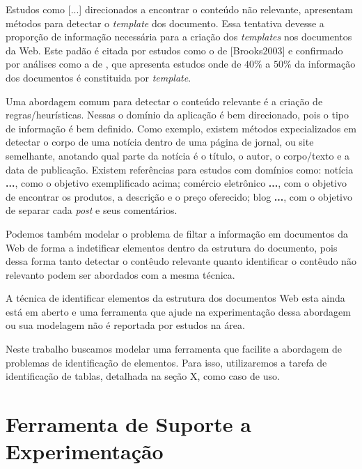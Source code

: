 \documentclass[12pt, a4paper]{article}
\newcommand{\remove}[1]{}
\begin{document}
Estudos como [...] direcionados a encontrar o conteúdo não relevante,
apresentam métodos para detectar o {\it template} dos documento.
	Essa tentativa devesse a proporção de informação necessária para a criação
	dos {\it templates} nos documentos da Web. Este padão é 
	citada por estudos como o de [Brooks2003] e confirmado por análises 
	como a de \cite{Gibson2005}, que apresenta estudos onde de $40\%$ a $50\%$ da 
  informação dos documentos é constituida por {\it template}.


Uma abordagem comum para detectar o conteúdo relevante é a criação de
regras/heurísticas. 
	Nessas 
		o domínio da aplicação é bem direcionado, pois o tipo de informação é 
		bem definido.
		Como exemplo,
			existem métodos expecializados em detectar o corpo de uma notícia 
			dentro de uma página de jornal, ou site semelhante,
			anotando qual parte da notícia é 
				o título,
				o autor, o corpo/texto e
				a data de publicação.
			Existem referências para estudos com domínios como:
				notícia {\bf \cite{}...}, como o objetivo exemplificado acima;
				comércio eletrônico {\bf \cite{}...}, com o objetivo de 
				encontrar os produtos, a descrição e o preço oferecido;
				blog {\bf \cite{}...}, com o objetivo de separar cada 
				{\it post} e seus comentários.

Podemos também modelar o problema de filtar a informação em documentos da Web
de forma a indetificar elementos dentro da estrutura do documento, pois 
dessa forma tanto detectar o contêudo relevante quanto identificar o contêudo 
não relevanto podem ser abordados com a mesma técnica. 

A técnica de identificar elementos da estrutura dos documentos Web esta
ainda está em aberto e uma ferramenta que ajude na experimentação dessa
abordagem ou sua modelagem não é reportada por estudos na área.

Neste trabalho buscamos modelar uma ferramenta que facilite a abordagem
de problemas de identificação de elementos. Para isso,
utilizaremos a tarefa de identificação de tablas, detalhada na seção X,
como caso de uso.

\remove{
Embora estudos como \cite{}... apresentem resutados "interessantes" na detecção de templates, 
}


\section{Ferramenta de Suporte a Experimentação}
\end{document}
